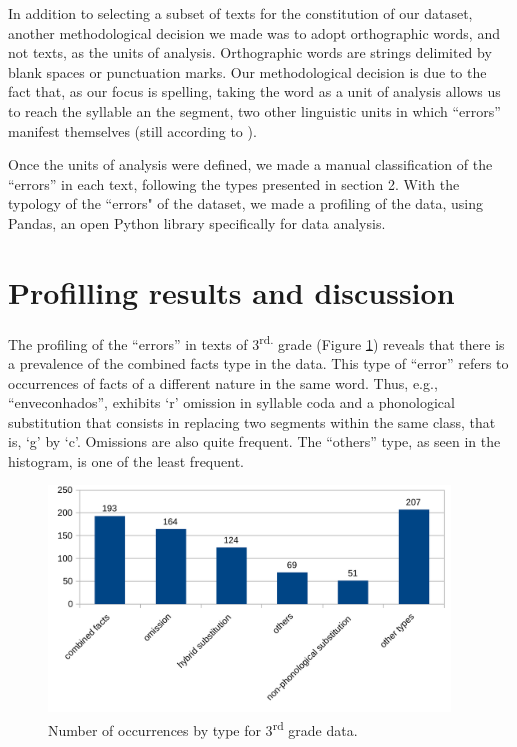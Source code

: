 In addition to selecting a subset of texts for the constitution of our dataset, another methodological decision we made was to adopt orthographic words, and not texts, as the units of analysis. Orthographic words are strings delimited by blank spaces or punctuation marks. Our methodological decision is due to the fact that, as our focus is spelling, taking the word as a unit of analysis allows us to reach the syllable an the segment, two other linguistic units in which ``errors'' manifest themselves (still according to \citet{Chacon2018}).

Once the units of analysis were defined, we made a manual classification of the ``errors'' in each text, following the types  presented in section 2. With the typology of the ``errors" of the dataset, we made a profiling of the data, using Pandas, an open Python library specifically for data analysis.

\section{Profilling results and discussion}

The profiling of the ``errors'' in texts of 3\textsuperscript{rd.} grade (Figure \ref{fig_3rd}) reveals that there is a prevalence of the combined facts type in the data. This type of ``error'' refers to occurrences of facts of a different nature in the same word. Thus, e.g., ``enveconhados'', exhibits `r' omission in syllable coda and a phonological substitution that consists in replacing two segments within the same class, that is, `g' by `c'. Omissions are also quite frequent. The ``others'' type, as seen in the histogram, is one of the least frequent.

\begin{figure}[!ht]
\centering
\includegraphics[width=0.95\textwidth]{imgs/adelaideherci15-histograma3.pdf}
\caption{Number of occurrences by type for 3\textsuperscript{rd} grade data.
}
\label{fig_3rd}
\end{figure}

